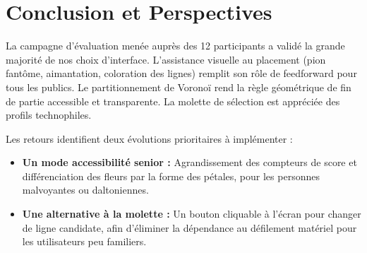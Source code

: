 \documentclass[11pt,a4paper]{article}
\begin{document}
\newpage

\section{Conclusion et Perspectives}

La campagne d'évaluation menée auprès des 12 participants a validé la grande majorité de nos choix d'interface. L'assistance visuelle au placement (pion fantôme, aimantation, coloration des lignes) remplit son rôle de feedforward pour tous les publics. Le partitionnement de Voronoï rend la règle géométrique de fin de partie accessible et transparente. La molette de sélection est appréciée des profils technophiles.

Les retours identifient deux évolutions prioritaires à implémenter :
\begin{itemize}
    \item \textbf{Un mode accessibilité senior :} Agrandissement des compteurs de score et différenciation des fleurs par la forme des pétales, pour les personnes malvoyantes ou daltoniennes.
    \item \textbf{Une alternative à la molette :} Un bouton cliquable à l'écran pour changer de ligne candidate, afin d'éliminer la dépendance au défilement matériel pour les utilisateurs peu familiers.
\end{itemize}
\end{document}
